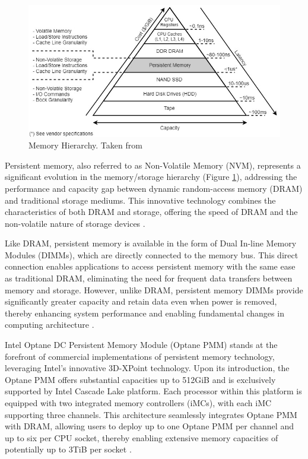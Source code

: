 \begin{figure}[ht]
    \centering
    \includegraphics[scale=0.6]{images/pmem_storage_pyramid.jpg}
    \caption{Memory Hierarchy. Taken from \cite{Introduc86:online}}
    \label{fig:pmem_storage_pyramid}
\end{figure}

Persistent memory, also referred to as Non-Volatile Memory (NVM), represents a significant evolution in the memory/storage hierarchy (Figure \ref{fig:pmem_storage_pyramid}), addressing the performance and capacity gap between dynamic random-access memory (DRAM) and traditional storage mediums. This innovative technology combines the characteristics of both DRAM and storage, offering the speed of DRAM and the non-volatile nature of storage devices \cite{scargall2020pmem}.

Like DRAM, persistent memory is available in the form of Dual In-line Memory Modules (DIMMs), which are directly connected to the memory bus. This direct connection enables applications to access persistent memory with the same ease as traditional DRAM, eliminating the need for frequent data transfers between memory and storage. However, unlike DRAM, persistent memory DIMMs provide significantly greater capacity and retain data even when power is removed, thereby enhancing system performance and enabling fundamental changes in computing architecture \cite{rudoff2017persistent,scargall2020pmem}.

Intel Optane DC Persistent Memory Module (Optane PMM) stands at the forefront of commercial implementations of persistent memory technology, leveraging Intel's innovative 3D-XPoint technology. Upon its introduction, the Optane PMM offers substantial capacities up to 512GiB and is exclusively supported by Intel Cascade Lake platform. Each processor within this platform is equipped with two integrated memory controllers (iMCs), with each iMC supporting three channels. This architecture seamlessly integrates Optane PMM with DRAM, allowing users to deploy up to one Optane PMM per channel and up to six per CPU socket, thereby enabling extensive memory capacities of potentially up to 3TiB per socket \cite{yang2020empirical,izraelevitz2019basic}.

